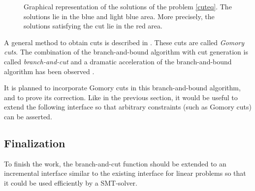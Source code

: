 \documentclass{article}
\begin{document}
\begin{figure}[h]
  \label{cutfig}
  \centering


  \caption{Graphical representation of the solutions of the problem
    \ref{cuteq}. The solutions lie in the blue and light blue area. More
    precisely, the solutions satisfying the cut lie in the red area.}
\end{figure}

A general method to obtain cuts is described in \cite[Section 4]{Dutertre2006}.
These cuts are called \textit{Gomory cuts}. The combination of the
branch-and-bound algorithm with cut generation is called
\textit{branch-and-cut} and a dramatic acceleration of the branch-and-bound
algorithm has been observed \cite{Ongoing2012}. %

It is planned to incorporate Gomory cuts in this branch-and-bound algorithm,
and to prove its correction. Like in the previous section, it would
be useful to extend the following interface so that arbitrary constraints (such
as Gomory cuts) can be asserted.

\subsection{Finalization}
To finish the work, the branch-and-cut function should be extended to an
incremental interface similar to the existing interface for linear problems so
that it could be used efficiently by a SMT-solver.
\end{document}
